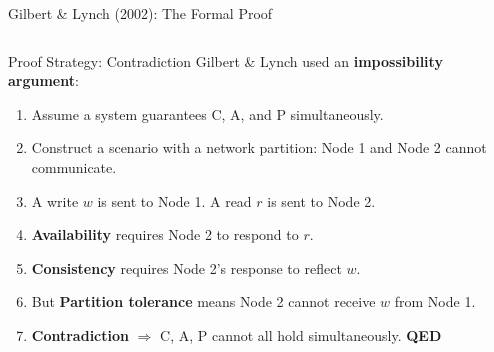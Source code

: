 \documentclass[aspectratio=169,10pt]{beamer}
\begin{document}
\begin{frame}{Gilbert \& Lynch (2002): The Formal Proof}
  \begin{columns}[T]
      \begin{block}{Proof Strategy: Contradiction}
        Gilbert \& Lynch used an \textbf{impossibility argument}:
        \vspace{4pt}
        \begin{enumerate}
          \item Assume a system guarantees C, A, and P simultaneously.
          \item Construct a scenario with a network partition: Node 1 and Node 2 cannot communicate.
          \item A write $w$ is sent to Node 1.  A read $r$ is sent to Node 2.
          \item \textbf{Availability} requires Node 2 to respond to $r$.
          \item \textbf{Consistency} requires Node 2's response to reflect $w$.
          \item But \textbf{Partition tolerance} means Node 2 cannot receive $w$ from Node 1.
          \item \textbf{Contradiction} $\Rightarrow$ C, A, P cannot all hold simultaneously. \hfill\textbf{QED}
        \end{enumerate}
      \end{block}

      \vspace{4pt}
      \begin{center}
\end{center}
\end{columns}
\end{frame}
\end{document}

